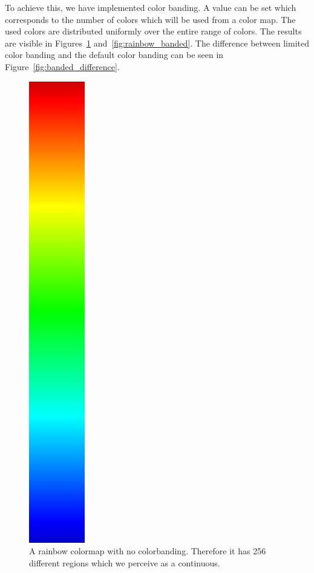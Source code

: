 		To achieve this, we have implemented color banding. 
		A value can be set which corresponds to the number of colors which will be used from a color map.
		The used colors are distributed uniformly over the entire range of colors.
		The results are visible in Figures~\ref{fig:rainbow} and~\ref{fig:rainbow_banded}.
		The difference between limited color banding and the default color banding can be seen in Figure~\ref{fig:banded_difference}.
		\begin{figure}[htb]
			\centering
			\includegraphics[angle=270, width=\linewidth, totalheight=1em, frame]{./content/pictures/rainbow.png}
			\caption{A rainbow colormap with no colorbanding. Therefore it has 256 different regions which we perceive as a continuous. }
			\label{fig:rainbow}
		\end{figure}
